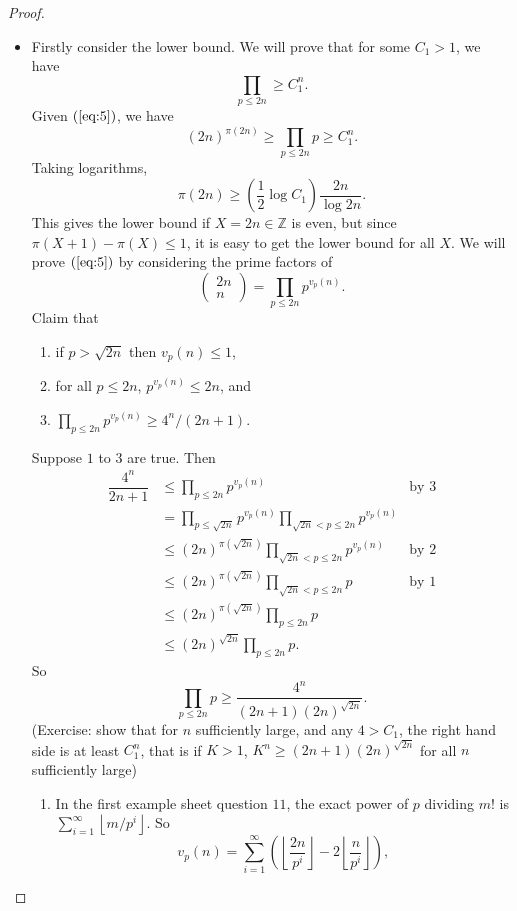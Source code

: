 \documentclass{article}
\newcommand{\Z}{\mathbb{Z}}
\newcommand{\rb}[1]{\left( #1 \right)}
\newcommand{\fb}[1]{\left\lfloor #1 \right\rfloor}
\newcommand{\two}[2]{\begin{pmatrix} #1 \\ #2 \end{pmatrix}}
\theoremstyle{definition}\newtheorem{definition}{Definition}
\theoremstyle{definition}\newtheorem{remark}[definition]{Remark}
\theoremstyle{definition}\newtheorem*{example}{Example}
\theoremstyle{definition}\newtheorem*{note}{Note}
\begin{document}
\begin{proof}
\hfill
\begin{itemize}
\item Firstly consider the lower bound. We will prove that for some $ C_1 > 1 $, we have
\begin{equation}
\label{eq:5}
\prod_{p \le 2n} \ge C_1^n.
\end{equation}
Given $ \rb{\ref{eq:5}} $, we have
$$ \rb{2n}^{\pi\rb{2n}} \ge \prod_{p \le 2n} p \ge C_1^n. $$
Taking logarithms,
$$ \pi\rb{2n} \ge \rb{\dfrac{1}{2}\log C_1}\dfrac{2n}{\log 2n}. $$
This gives the lower bound if $ X = 2n \in \Z $ is even, but since $ \pi\rb{X + 1} - \pi\rb{X} \le 1 $, it is easy to get the lower bound for all $ X $. We will prove $ \rb{\ref{eq:5}} $ by considering the prime factors of
$$ \two{2n}{n} = \prod_{p \le 2n} p^{v_p\rb{n}}. $$
Claim that
\begin{enumerate}
\item if $ p > \sqrt{2n} $ then $ v_p\rb{n} \le 1 $,
\item for all $ p \le 2n $, $ p^{v_p\rb{n}} \le 2n $, and
\item $ \prod_{p \le 2n} p^{v_p\rb{n}} \ge 4^n / \rb{2n + 1} $.
\end{enumerate}
Suppose $ 1 $ to $ 3 $ are true. Then
\begin{align*}
\dfrac{4^n}{2n + 1}
& \le \prod_{p \le 2n} p^{v_p\rb{n}} & \text{by } 3 \\
& = \prod_{p \le \sqrt{2n}} p^{v_p\rb{n}} \prod_{\sqrt{2n} < p \le 2n} p^{v_p\rb{n}} \\
& \le \rb{2n}^{\pi\rb{\sqrt{2n}}} \prod_{\sqrt{2n} < p \le 2n} p^{v_p\rb{n}} & \text{by } 2 \\
& \le \rb{2n}^{\pi\rb{\sqrt{2n}}} \prod_{\sqrt{2n} < p \le 2n} p & \text{by } 1 \\
& \le \rb{2n}^{\pi\rb{\sqrt{2n}}} \prod_{p \le 2n} p \\
& \le \rb{2n}^{\sqrt{2n}} \prod_{p \le 2n} p.
\end{align*}
So
$$ \prod_{p \le 2n} p \ge \dfrac{4^n}{\rb{2n + 1}\rb{2n}^{\sqrt{2n}}}. $$
(Exercise: show that for $ n $ sufficiently large, and any $ 4 > C_1 $, the right hand side is at least $ C_1^n $, that is if $ K > 1 $, $ K^n \ge \rb{2n + 1}\rb{2n}^{\sqrt{2n}} $ for all $ n $ sufficiently large)
\begin{enumerate}
\item In the first example sheet question $ 11 $, the exact power of $ p $ dividing $ m! $ is $ \sum_{i = 1}^\infty \fb{m / p^i} $. So
$$ v_p\rb{n} = \sum_{i = 1}^\infty \rb{\fb{\dfrac{2n}{p^i}} - 2\fb{\dfrac{n}{p^i}}}, $$

\end{enumerate}
\end{itemize}
\end{proof}
\end{document}
